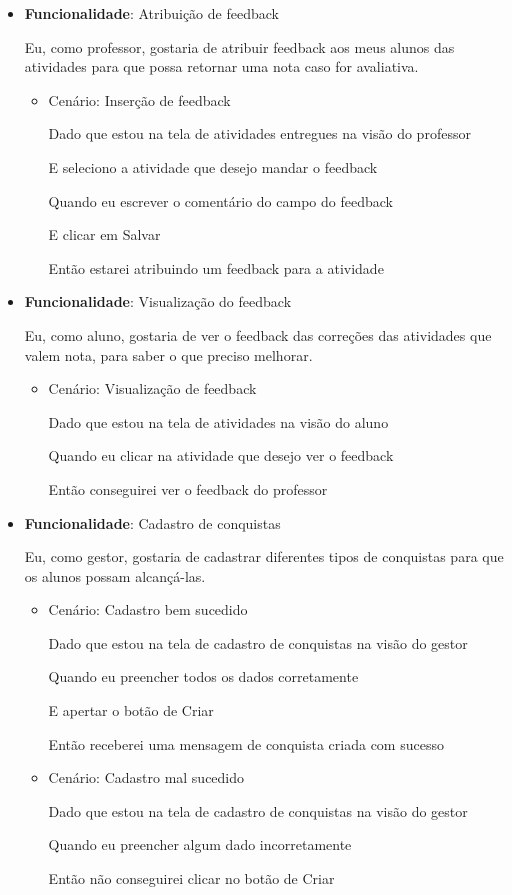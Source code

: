 \begin{itemize}
\item\textbf{Funcionalidade}: Atribuição de \gls{feedback}
    
    Eu, como professor, gostaria de atribuir \gls{feedback} aos meus alunos das atividades para que possa retornar uma nota caso for avaliativa.
    \begin{itemize}
        \item Cenário: Inserção de \gls{feedback}
        \par Dado que estou na tela de atividades entregues na visão do professor
        \par E seleciono a atividade que desejo mandar o feedback
        \par Quando eu escrever o comentário do campo do feedback
        \par E clicar em Salvar
        \par Então estarei atribuindo um feedback para a atividade
    \end{itemize}

\item\textbf{Funcionalidade}: Visualização do \gls{feedback}
    
    Eu, como aluno, gostaria de ver o \gls{feedback} das correções das atividades que valem nota, para saber o que preciso melhorar.
    \begin{itemize}
        \item Cenário: Visualização de \gls{feedback}
        \par Dado que estou na tela de atividades na visão do aluno
        \par Quando eu clicar na atividade que desejo ver o feedback
        \par Então conseguirei ver o feedback do professor
    \end{itemize}

\item\textbf{Funcionalidade}: Cadastro de conquistas
    
    Eu, como gestor, gostaria de cadastrar diferentes tipos de conquistas para que os alunos possam alcançá-las.
    \begin{itemize}
        \item Cenário: Cadastro bem sucedido  
        \par Dado que estou na tela de cadastro de conquistas na visão do gestor
        \par Quando eu preencher todos os dados corretamente
        \par E apertar o botão de Criar
        \par Então receberei uma mensagem de conquista criada com sucesso
    \end{itemize}   
    \begin{itemize}
        \item Cenário: Cadastro mal sucedido  
        \par Dado que estou na tela de cadastro de conquistas na visão do gestor
        \par Quando eu preencher algum dado incorretamente
        \par Então não conseguirei clicar no botão de Criar
    \end{itemize}   


\end{itemize}
